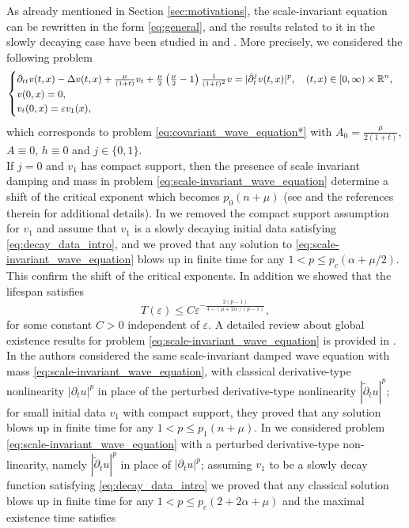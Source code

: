 \documentclass[11pt,reqno]{amsart}
\theoremstyle{definition}
\numberwithin{equation}{section}
\newcommand{\R}{\mathbb{R}}
\newcommand{\eps}{\varepsilon}
\begin{document}
As already mentioned in Section \ref{sec:motivations}, the scale-invariant equation can be rewritten in the form \eqref{eq:general}, and the results related to it in the slowly decaying case have been studied in \cite{CGL2021} and \cite{GirardiLucente2021}. More precisely, we considered the following problem
%
\begin{equation}
\label{eq:scale-invariant_wave_equation}
{\small
\begin{cases}
\partial_{tt}v(t,x)- \Delta v(t,x)+\frac{\mu}{(1+t)}v_t +\frac{\mu}{2}\left(\frac{\mu}{2}-1\right)\frac{1}{(1+t)^2}v=|\tilde\partial_t^jv(t,x)|^p, \quad (t,x)\in [0,\infty)\times \R^n, \\
v(0,x)=0,&\\
v_t(0,x)= \varepsilon v_1(x),&
\end{cases}}
\end{equation}
%
which corresponds to problem \eqref{eq:covariant_wave_equation*} with $A_0=\frac{\mu}{2(1+t)}$, $A\equiv 0$, $h\equiv 0$ and $j\in \{0,1\}$. \\
If $j=0$ and $v_1$ has compact support, then the presence of scale invariant damping and mass in problem \eqref{eq:scale-invariant_wave_equation} determine a shift of the critical exponent which becomes $p_0(n+\mu)$ (see \cite{PT2021} and the references therein for additional details). In \cite{CGL2021} we removed the compact support assumption for $v_1$ and assume that $v_1$ is a slowly decaying initial data satisfying \eqref{eq:decay_data_intro}, and we proved that any solution to \eqref{eq:scale-invariant_wave_equation} blows up in finite time for any $1<p\leq p_c(\alpha+\mu/2)$. This confirm the shift of the critical exponents. In addition we showed that the lifespan satisfies
%
\begin{equation*}
T(\eps)\leq C \eps^{-\frac{2(p-1)}{4-(\mu+2\alpha)(p-1)}},
\end{equation*}
for some constant $C>0$ independent of $\eps$. A detailed review about global existence results for problem \eqref{eq:scale-invariant_wave_equation} is provided in \cite{CGL2021}. \\
In \cite{PT2021} the authors considered the same scale-invariant damped wave equation with mass \eqref{eq:scale-invariant_wave_equation}, with classical derivative-type nonlinearity $|\partial_t u|^p$ in place of the perturbed derivative-type nonlinearity $|\tilde\partial_t u|^p$; for small initial data $v_1$ with compact support, they proved that any solution blows up in finite time for any $1<p\leq p_1(n+\mu)$. In \cite{GirardiLucente2021} we considered problem \eqref{eq:scale-invariant_wave_equation} with a perturbed derivative-type non-linearity, namely $|\tilde\partial_t u|^p$ in place of $|\partial_t u|^p$; assuming $v_1$ to be a slowly decay function satisfying \eqref{eq:decay_data_intro} we proved that any classical solution blows up in finite time for any $1<p\leq p_c(2+2\alpha+\mu)$ and the maximal existence time satisfies
\end{document}
